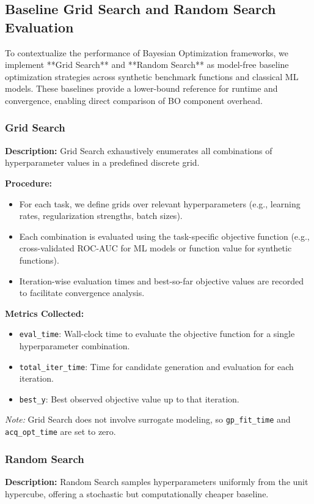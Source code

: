 \documentclass[11pt]{article}
\begin{document}
\subsection{Baseline Grid Search and Random Search Evaluation}

To contextualize the performance of Bayesian Optimization frameworks, we implement **Grid Search** and **Random Search** as model-free baseline optimization strategies across synthetic benchmark functions and classical ML models. These baselines provide a lower-bound reference for runtime and convergence, enabling direct comparison of BO component overhead.

\subsubsection{Grid Search}
\textbf{Description:} Grid Search exhaustively enumerates all combinations of hyperparameter values in a predefined discrete grid.

\textbf{Procedure:}
\begin{itemize}
    \item For each task, we define grids over relevant hyperparameters (e.g., learning rates, regularization strengths, batch sizes).
    \item Each combination is evaluated using the task-specific objective function (e.g., cross-validated ROC-AUC for ML models or function value for synthetic functions).
    \item Iteration-wise evaluation times and best-so-far objective values are recorded to facilitate convergence analysis.
\end{itemize}

\textbf{Metrics Collected:}
\begin{itemize}
    \item \texttt{eval\_time}: Wall-clock time to evaluate the objective function for a single hyperparameter combination.
    \item \texttt{total\_iter\_time}: Time for candidate generation and evaluation for each iteration.
    \item \texttt{best\_y}: Best observed objective value up to that iteration.
\end{itemize}

\textit{Note:} Grid Search does not involve surrogate modeling, so \texttt{gp\_fit\_time} and \texttt{acq\_opt\_time} are set to zero.

\subsubsection{Random Search}
\textbf{Description:} Random Search samples hyperparameters uniformly from the unit hypercube, offering a stochastic but computationally cheaper baseline.
\end{document}
